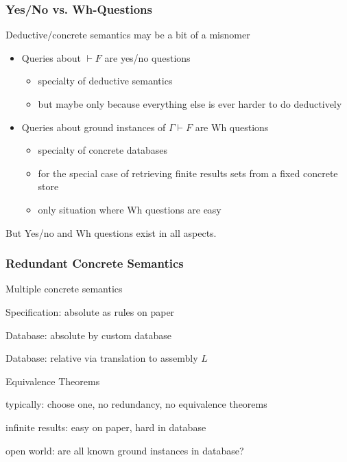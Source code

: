 \begin{frame}\frametitle{Yes/No vs. Wh-Questions}
Deductive/concrete semantics may be a bit of a misnomer
\begin{itemize}
\item Queries about $\vdash F$ are yes/no questions
 \begin{itemize}
 \item specialty of deductive semantics
 \item but maybe only because everything else is ever harder to do deductively
 \end{itemize}
\item Queries about ground instances of $\Gamma \vdash F$ are Wh questions
 \begin{itemize}
 \item specialty of concrete databases
 \item for the special case of retrieving finite results sets from a fixed concrete store
 \item only situation where Wh questions are easy
 \end{itemize}
\end{itemize}
But Yes/no and Wh questions exist in all aspects.
\end{frame}

\begin{frame}\frametitle{Redundant Concrete Semantics}
\begin{blockitems}{Multiple concrete semantics}
\item Specification: absolute as rules on paper
\item Database: absolute by custom database
\item Database: relative via translation to assembly $L$
\end{blockitems}

\begin{blockitems}{Equivalence Theorems}
\item typically: choose one, no redundancy, no equivalence theorems
\item infinite results: easy on paper, hard in database
\item open world: are all known ground instances in database?
\end{blockitems}
\end{frame}

